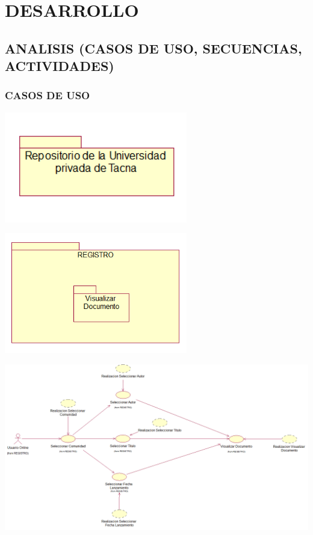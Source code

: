 \section{DESARROLLO} 
\subsection{ANALISIS (CASOS DE USO, SECUENCIAS, ACTIVIDADES)}
\subsubsection{CASOS DE USO}
\thinspace
\thinspace
\thinspace
\thinspace
\thinspace
\thinspace
\thinspace
\thinspace
\thinspace
\thinspace
\thinspace
\thinspace
\thinspace
\thinspace
\thinspace
\thinspace
\begin{center}
\includegraphics[width=8cm]{./Imagenes/CasoUso1}
\end{center}
\thinspace
\thinspace
\thinspace
\thinspace
\thinspace
\thinspace
\thinspace
\thinspace
\thinspace
\thinspace
\thinspace
\thinspace
\thinspace
\thinspace
\thinspace
\thinspace
\thinspace
\begin{center}
\includegraphics[width=8cm]{./Imagenes/CasoUso2}
\end{center}	
\thinspace
\thinspace
\thinspace
\thinspace
\thinspace
\thinspace
\thinspace
\thinspace
\thinspace
\thinspace
\thinspace
\thinspace
\thinspace
\thinspace
\thinspace
\thinspace
\thinspace
\thinspace
\thinspace
\thinspace
\thinspace
\thinspace
\thinspace
\thinspace
\thinspace
\thinspace
\begin{center}
\includegraphics[width=19cm]{./Imagenes/CasoUso3}
\end{center}


